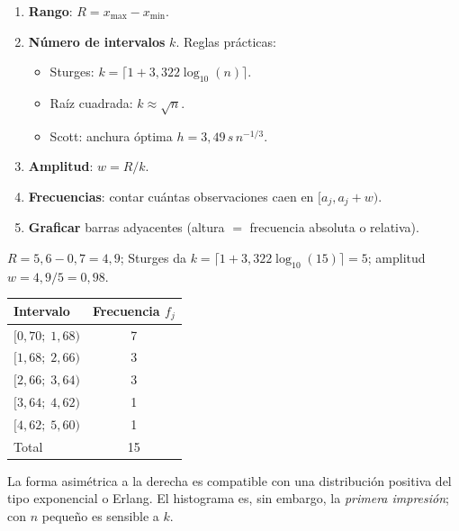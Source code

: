 \documentclass[11pt, letterpaper]{article}
\begin{document}
\begin{metodobox}
\begin{enumerate}
    \item \textbf{Rango}: $R = x_{\max} - x_{\min}$.
    \item \textbf{Número de intervalos} $k$. Reglas prácticas:
      \begin{itemize}
        \item Sturges: $k = \lceil 1 + 3{,}322\log_{10}(n)\rceil$.
        \item Raíz cuadrada: $k \approx \sqrt{n}$.
        \item Scott: anchura óptima $h = 3{,}49\,s\,n^{-1/3}$.
      \end{itemize}
    \item \textbf{Amplitud}: $w = R/k$.
    \item \textbf{Frecuencias}: contar cuántas observaciones caen en $[a_j, a_j + w)$.
    \item \textbf{Graficar} barras adyacentes (altura $=$ frecuencia absoluta o relativa).
\end{enumerate}
\end{metodobox}

\begin{ejemplobox}
$R = 5{,}6 - 0{,}7 = 4{,}9$; Sturges da $k = \lceil 1 + 3{,}322\log_{10}(15)\rceil = 5$; amplitud $w = 4{,}9/5 = 0{,}98$.

\begin{center}\small
\renewcommand{\arraystretch}{1.2}
\begin{tabular}{lc}
\toprule
\textbf{Intervalo} & \textbf{Frecuencia $f_j$} \\
\midrule
$[0{,}70;\;1{,}68)$ & 7 \\
$[1{,}68;\;2{,}66)$ & 3 \\
$[2{,}66;\;3{,}64)$ & 3 \\
$[3{,}64;\;4{,}62)$ & 1 \\
$[4{,}62;\;5{,}60)$ & 1 \\
\midrule
Total & 15 \\
\bottomrule
\end{tabular}
\end{center}

La forma asimétrica a la derecha es compatible con una distribución positiva del tipo exponencial o Erlang. El histograma es, sin embargo, la \emph{primera impresión}; con $n$ pequeño es sensible a $k$.
\end{ejemplobox}
\end{document}
